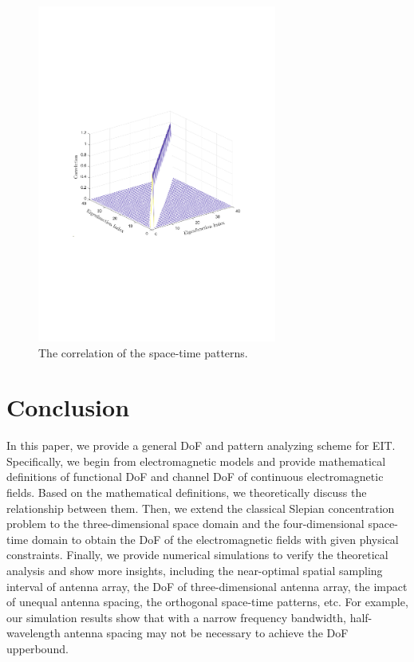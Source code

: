 \documentclass[12pt,draftclsnofoot,journal,onecolumn]{IEEEtran}
\begin{document}
\begin{figure}
	\centering 
	\includegraphics[width=0.7\textwidth]{figs/eigen_function_correlation.pdf} 
	\caption{The correlation of the space-time patterns.} 
	\label{pattern_correlation}
\end{figure}

\section{Conclusion}
In this paper, we provide a general DoF and pattern analyzing scheme for EIT. {\color{red}Specifically, we begin from electromagnetic models and provide mathematical definitions of functional DoF and channel DoF of continuous electromagnetic fields. Based on the mathematical definitions, we theoretically discuss the relationship between them.
Then, we extend the classical Slepian concentration problem to the three-dimensional space domain and the four-dimensional space-time domain to obtain the DoF of the electromagnetic fields with given physical constraints.} Finally, we provide numerical simulations to verify the theoretical analysis and show more insights, including the near-optimal spatial sampling interval of antenna array, the DoF of three-dimensional antenna array, the impact of unequal antenna spacing, the orthogonal space-time patterns, etc. For example, our simulation results show that with a narrow frequency bandwidth, half-wavelength antenna spacing may not be necessary to achieve the DoF upperbound.
\end{document}
